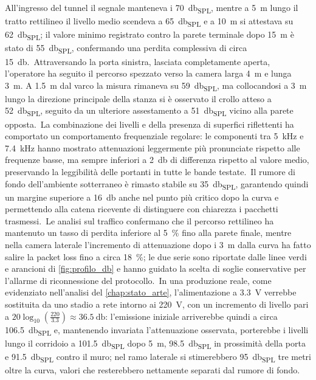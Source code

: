 All'ingresso del tunnel il segnale manteneva i \SI{70}{\decibel_{SPL}}, mentre a \SI{5}{\meter} lungo il tratto rettilineo il livello medio scendeva a \SI{65}{\decibel_{SPL}} e a \SI{10}{\meter} si attestava su \SI{62}{\decibel_{SPL}}; il valore minimo registrato contro la parete terminale dopo \SI{15}{\meter} è stato di \SI{55}{\decibel_{SPL}}, confermando una perdita complessiva di circa \SI{15}{\decibel}.\ Attraversando la porta sinistra, lasciata completamente aperta, l'operatore ha seguito il percorso spezzato verso la camera larga \SI{4}{\meter} e lunga \SI{3}{\meter}. A \SI{1.5}{\meter} dal varco la misura rimaneva su \SI{59}{\decibel_{SPL}}, ma collocandosi a \SI{3}{\meter} lungo la direzione principale della stanza si è osservato il crollo atteso a \SI{52}{\decibel_{SPL}}, seguito da un ulteriore assestamento a \SI{51}{\decibel_{SPL}} vicino alla parete opposta.\ La combinazione dei livelli e della presenza di superfici riflettenti ha comportato un comportamento frequenziale regolare: le componenti tra \SI{5}{\kilo\hertz} e \SI{7.4}{\kilo\hertz} hanno mostrato attenuazioni leggermente più pronunciate rispetto alle frequenze basse, ma sempre inferiori a \SI{2}{\decibel} di differenza rispetto al valore medio, preservando la leggibilità delle portanti in tutte le bande testate.\ Il rumore di fondo dell'ambiente sotterraneo è rimasto stabile su \SI{35}{\decibel_{SPL}}, garantendo quindi un margine superiore a \SI{16}{\decibel} anche nel punto più critico dopo la curva e permettendo alla catena ricevente di distinguere con chiarezza i pacchetti trasmessi.\ Le analisi sul traffico confermano che il percorso rettilineo ha mantenuto un tasso di perdita inferiore al \SI{5}{\percent} fino alla parete finale, mentre nella camera laterale l'incremento di attenuazione dopo i \SI{3}{\meter} dalla curva ha fatto salire la packet loss fino a circa \SI{18}{\percent}; le due serie sono riportate dalle linee verdi e arancioni di \autoref{fig:profilo_db} e hanno guidato la scelta di soglie conservative per l'allarme di riconnessione del protocollo.\ In una produzione reale, come evidenziato nell'analisi del \autoref{chap:stato_arte}, l'alimentazione a \SI{3.3}{\volt} verrebbe sostituita da uno stadio a rete intorno ai \SI{220}{\volt}, con un incremento di livello pari a $20\log_{10}\!\left(\tfrac{220}{3.3}\right) \approx \SI{36.5}{\decibel}$: l'emissione iniziale arriverebbe quindi a circa \SI{106.5}{\decibel_{SPL}} e, mantenendo invariata l'attenuazione osservata, porterebbe i livelli lungo il corridoio a \SI{101.5}{\decibel_{SPL}} dopo \SI{5}{\meter}, \SI{98.5}{\decibel_{SPL}} in prossimità della porta e \SI{91.5}{\decibel_{SPL}} contro il muro; nel ramo laterale si stimerebbero \SI{95}{\decibel_{SPL}} tre metri oltre la curva, valori che resterebbero nettamente separati dal rumore di fondo.

